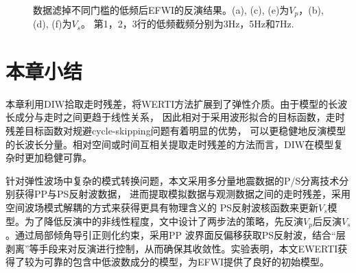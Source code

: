 \begin{figure}[!thb]
   \\
   \caption{数据滤掉不同门槛的低频后EFWI的反演结果。(a), (c), (e)为$V_p$，(b), (d), (f)为$V_s$。
   第1，2，3行的低频截频分别为3Hz，5Hz和7Hz.}
   \label{fig:LowFreqCut_EFWI}
\end{figure}



\section{本章小结}
本章利用DIW拾取走时残差，将WERTI方法扩展到了弹性介质。由于模型的长波长成分与走时之间更趋于线性关系，
因此相对于采用波形拟合的目标函数，走时残差目标函数对规避cycle-skipping问题有着明显的优势，
可以更稳健地反演模型的长波长分量。相对空间或时间互相关提取走时残差的方法而言，DIW在模型复杂时更加稳健可靠。

针对弹性波场中复杂的模式转换问题，本文采用多分量地震数据的P/S分离技术分别获得PP与PS反射波数据，
进而提取模拟数据与观测数据之间的走时残差，采用空间波场模式解耦的方式来获得更具有物理含义的
PS反射波核函数来更新$V_s$模型。为了降低反演中的非线性程度，文中设计了两步法的策略，先反演$V_p$后反演$V_s$。通过局部倾角导引正则化约束，采用PP
波界面反偏移获取PS反射波，结合“层剥离”等手段来对反演进行控制，从而确保其收敛性。实验表明，本文EWERTI获得了较为可靠的包含中低波数成分的模型，为EFWI提供了良好的初始模型。
